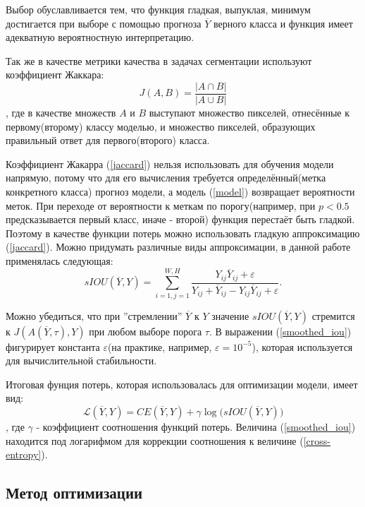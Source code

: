 \documentclass[14pt, a4paper, oneside, bold]{extarticle}
\begin{document}
Выбор обуславливается тем, что функция гладкая, выпуклая, минимум достигается 
при выборе с помощью прогноза $\overline{Y}$ верного класса и функция 
имеет адекватную вероятностную интерпретацию.

Так же в качестве метрики качества в задачах сегментации используют коэффициент Жаккара: 
\begin{equation} \label{jaccard}
	J(A, B) = \frac{|A \cap B|}{|A \cup B|} 
\end{equation}
, где в качестве множеств $A$ и $B$ выступают множество пикселей, отнесённые к 
первому(второму) классу моделью, и множество пикселей, образующих правильный ответ для первого(второго) класса.

Коэффициент Жакарра (\ref{jaccard}) нельзя использовать для обучения модели напрямую, потому что для его вычисления требуется определённый(метка конкретного класса) прогноз модели, а модель 
(\ref{model}) возвращает вероятности меток. При переходе от вероятности к меткам по порогу(например, при $p<0.5$ предсказывается первый класс, иначе - второй) функция перестаёт быть гладкой. Поэтому в качестве функции потерь можно использовать гладкую аппроксимацию (\ref{jaccard}). Можно придумать различные виды аппроксимации, в данной работе применялась следующая:
\begin{equation} \label{smoothed_iou}
	sIOU(\overline{Y}, Y) = \sum \limits_{i=1, j=1}^{W, H}
		\frac{Y_{ij} \overline{Y}_{ij} + \varepsilon}
		{Y_{ij} + \overline{Y}_{ij} 
			- Y_{ij} \overline{Y}_{ij} + \varepsilon}.
\end{equation} 
 
Можно убедиться, что при ''стремлении'' 
$\overline{Y}$ к $Y$ значение $sIOU(\overline{Y}, Y)$ стремится к $J(A(\overline{Y}, \tau), Y)$ при любом выборе порога $\tau$. В выражении (\ref{smoothed_iou}) фигурирует 
константа $\varepsilon$(на практике, например, $\varepsilon=10^{-5}$), которая используется для вычислительной стабильности.
 
Итоговая фунция потерь, которая использовалась для оптимизации модели, имеет вид:
\begin{equation} \label{final_loss}
	\mathcal{L}(\overline{Y}, Y) = CE(\overline{Y}, Y)
		+ \gamma \log \bigl( sIOU(\overline{Y}, Y) \bigr)
\end{equation}
, где $\gamma$ - коэффициент соотношения функций потерь. Величина (\ref{smoothed_iou}) находится под логарифмом для коррекции соотношения к величине (\ref{cross-entropy}).

\subsection{Метод оптимизации}
\end{document}
